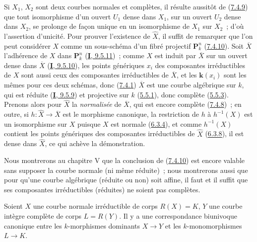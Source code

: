 Si $X_1$, $X_2$ sont deux courbes normales et complètes, il résulte aussitôt
de (\hyperref[II.7.4.9-fr]{7.4.9}) que tout isomorphisme d'un ouvert $U_1$
dense dans $X_1$, sur un ouvert $U_2$ dense dans $X_2$, se prolonge de façon
unique en un isomorphisme de $X_1$ sur $X_2$~; d'où l'assertion d'unicité. Pour
prouver l'existence de $\widehat{X}$, il suffit de remarquer que l'on peut
considérer $X$ comme un sous-schéma d'un fibré projectif $\mathbf{P}_k^n$
(\hyperref[II.7.4.10-fr]{7.4.10}). Soit $\overline{X}$ l'adhérence de $X$ dans
$\mathbf{P}_k^n$ (\hyperref[I.9.5.11-fr]{\textbf{I}, 9.5.11})~; comme $X$ est induit
par $\overline{X}$ sur un ouvert dense dans $\overline{X}$
(\hyperref[I.9.5.10-fr]{\textbf{I}, 9.5.10}), les points génériques $x_i$ des
composantes irréductibles de $X$ sont aussi ceux des composantes irréductibles
de $\overline{X}$, et les $\boldsymbol{k}(x_i)$ sont les mêmes pour ces deux schémas, donc
(\hyperref[II.7.4.1-fr]{7.4.1}) $\overline{X}$ est une courbe algébrique sur
$k$, qui est réduite (\hyperref[I.9.5.9-fr]{\textbf{I}, 9.5.9}) et projective sur $k$
(\hyperref[II.5.5.1-fr]{5.5.1}), donc complète
(\hyperref[II.5.5.3-fr]{5.5.3}). Prenons alors pour $\widehat{X}$ la
\emph{normalisée} de $\overline{X}$, qui est encore complète
(\hyperref[II.7.4.8-fr]{7.4.8})~; en outre, si
$h:\widehat{X}\to\overline{X}$ est le morphisme canonique, la restriction de
$h$ à $h^{-1}(X)$ est un isomorphisme sur $X$ puisque $X$ est normale
(\hyperref[II.6.3.4-fr]{6.3.4}), et comme $h^{-1}(X)$ contient les points
génériques des composantes irréductibles de $\widehat{X}$
(\hyperref[II.6.3.8-fr]{6.3.8}), il est dense dans $\widehat{X}$, ce qui achève
la démonstration.


\begin{remark}[7.4.12]
\label{II.7.4.12-fr}
Nous montrerons au chapitre V que la conclusion de
(\hyperref[II.7.4.10-fr]{7.4.10}) est encore valable sans supposer la courbe
normale (ni même réduite)~; nous montrerons aussi que pour qu'une courbe
algébrique (réduite ou non) soit affine, il faut et il suffit que ses
composantes irréductibles (réduites) ne soient pas complètes.
\end{remark}

\begin{corollary}[7.4.13]
\label{II.7.4.13-fr}
Soient $X$ une courbe \textup{normale} irréductible de corps $R(X)=K$, $Y$ une courbe
intègre \textup{complète} de corps $L=R(Y)$. Il y a une correspondance biunivoque
canonique entre les $k$-morphismes \textup{dominants} $X\to Y$ et les
$k$-monomorphismes $L\to K$.
\end{corollary}

